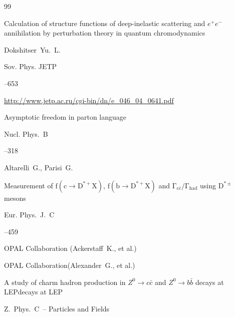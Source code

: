 \begin{thebibliography}{99}

\paper Calculation of structure functions of deep-inelastic scattering and $e^+e^-$ annihilation by perturbation theory in quantum chromodynamics 

\by  Dokshitser~Yu.~L.

\jour Sov. Phys. JETP 



--653


\elink \url{http://www.jetp.ac.ru/cgi-bin/dn/e_046_04_0641.pdf}




\paper Asymptotic freedom in parton language


\jour Nucl. Phys.~B



--318

\by  Altarelli~G.,  Parisi~G.







\paper Measurement of $\mathrm{ f(c\to D^{*+}X)}$, $\mathrm{ f(b\to D^{*+}X)}$ and $\mathrm{ \Gamma_{c \bar c}/\Gamma_{had}}$  using $\mathrm{  D^{*\pm}}$ mesons


\jour Eur. Phys.~J.~C 



--459

\by OPAL Collaboration (Ackerstaff~K., et al.)





\by  OPAL Collaboration(Alexander~G., et al.)

\paper A study of charm hadron production in $Z^0 \to c\bar c$ and $Z^0 \to b\bar b$ decays at LEPdecays at LEP

\jour Z.~Phys.~C~-- Particles and Fields 




\end{thebibliography}
